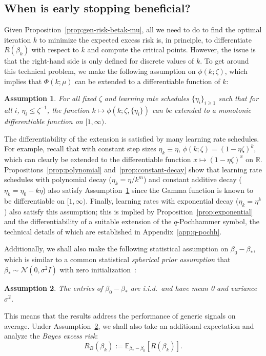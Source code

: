 \documentclass[11pt]{article}
\newtheorem{assumption}{Assumption}
\begin{document}
\subsection{When is early stopping beneficial?}

Given Proposition~\ref{prop:gen-risk-betak-mu}, all we need to do to find the optimal iteration $k$ to minimize the expected excess risk is, in principle, to differentiate $R(\beta_k)$ with respect to $k$ and compute the critical points. However, the issue is that the right-hand side is only defined for discrete values of $k$. To get around this technical problem, we make the following assumption on $\phi(k; \zeta)$, which implies that $\Phi(k; \mu)$ can be extended to a differentiable function of $k$:

\begin{assumption} \label{assumption:differentiable-extension}
For all fixed $\zeta$ and learning rate schedules $\{\eta_i\}_{i \geq 1}$ such that for all $i$, $\eta_i \le \zeta^{-1}$, the function $k \mapsto \phi(k; \zeta, \{\eta_i\})$ can be extended to a monotonic differentiable function on $[1, \infty)$.
\end{assumption}

The differentiability of the extension is satisfied by many learning rate schedules. For example, recall that with constant step sizes $\eta_k \equiv \eta$, $\phi(k; \zeta) = (1 - \eta \zeta)^k$, which can clearly be extended to the differentiable function $x \mapsto (1 - \eta \zeta)^x$ on $\mathbb{R}$.
Propositions~\ref{prop:polynomial} and~\ref{prop:constant-decay} show that learning rate schedules with polynomial decay ($\eta_k = \eta/k^m$) and constant additive decay ($\eta_k = \eta_0 - k\eta$) also satisfy Assumption~\ref{assumption:differentiable-extension} since the Gamma function is known to be differentiable on $[1, \infty)$.
Finally, learning rates with exponential decay ($\eta_k = \eta^k$) also satisfy this assumption; this is implied by Proposition~\ref{prop:exponential} and the differentiability of a suitable extension of the $q$-Pochhammer symbol, the technical details of which are established in Appendix~\ref{app:q-pochh}.

Additionally, we shall also make the following statistical assumption on $\beta_0 - \beta_*$, which is similar to a common statistical \emph{spherical prior assumption} that $\beta_* \sim \mathcal{N}(0, \sigma^2 I)$ with zero initialization~\cite{DobribanWager2018, AdSaSo2020, ali2019continuous}:
\begin{assumption} \label{assumption:spherical}
    The entries of $\beta_0 - \beta_*$ are i.i.d.\ and have mean 0 and variance $\sigma^2$.
\end{assumption}
This means that the results address the performance of generic signals on average. Under Assumption~\ref{assumption:spherical}, we shall also take an additional expectation and analyze the \emph{Bayes excess risk}:
\begin{equation} \label{eq:bayes_risk}
    R_B(\beta_k) := \mathbb{E}_{\beta_*-\beta_0}[R(\beta_k)].
\end{equation}
\end{document}
